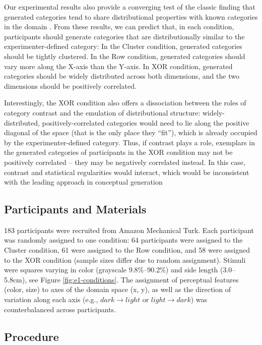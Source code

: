 \documentclass[12pt]{article}
\begin{document}
\begin{flushleft}
Our experimental results also provide a converging test of the classic finding
that generated categories tend to share distributional properties with known
categories in the domain \citep{jern2013probabilistic,ward1994structured}. From
these results, we can predict that, in each condition, participants should
generate categories that are distributionally similar to the
experimenter-defined category: In the Cluster condition, generated categories
should be tightly clustered. In the Row condition, generated categories should
vary more along the X-axis than the Y-axis. In XOR condition, generated
categories should be widely distributed across both dimensions, and the two
dimensions should be positively correlated.

Interestingly, the XOR condition also offers a dissociation between the roles of
category contrast and the emulation of distributional structure:
widely-distributed, positively-correlated categories would need to lie along the
positive diagonal of the space (that is the only place they ``fit''), which is
already occupied by the experimenter-defined category. Thus, if contrast plays a
role, exemplars in the generated categories of participants in the XOR condition
may not be positively correlated -- they may be negatively correlated instead.
In this case, contrast and statistical regularities would interact, which would
be inconsistent with the leading approach in conceptual generation
\citep{jern2013probabilistic}


\subsection{Participants and Materials}

183 participants were recruited from Amazon Mechanical Turk. Each participant
was randomly assigned to one condition: 64 participants were assigned to the
Cluster condition, 61 were assigned to the Row condition, and 58 were assigned
to the XOR condition (sample sizes differ due to random assignment). Stimuli
were squares varying in color (grayscale 9.8\%--90.2\%) and side length
(3.0--5.8cm), see Figure \ref{fig:e1-conditions}. The assignment of perceptual
features (color, size) to axes of the domain space (x, y), as well as the
direction of variation along each axis (e.g., $dark \rightarrow light$ or $light
\rightarrow dark$) was counterbalanced across participants.

\subsection{Procedure}


\end{flushleft}
\end{document}

